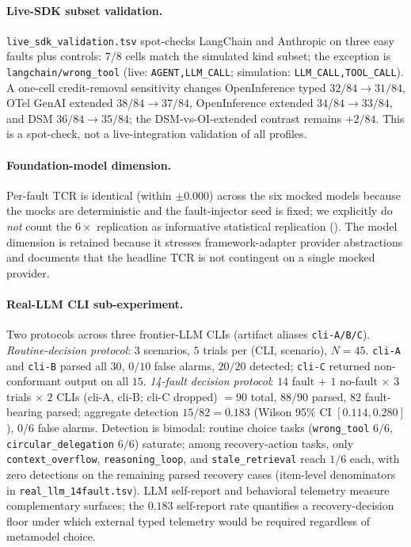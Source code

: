 \documentclass[a4paper,UKenglish,cleveref,autoref,thm-restate]{lipics-v2021}
\begin{document}
\paragraph*{Live-SDK subset validation.}
\texttt{live\_sdk\_validation.tsv} spot-checks LangChain and Anthropic
on three easy faults plus controls: 7/8 cells match the simulated
kind subset; the exception is \texttt{langchain/wrong\_tool}
(live: \texttt{AGENT,LLM\_CALL}; simulation:
\texttt{LLM\_CALL,TOOL\_CALL}). A one-cell credit-removal sensitivity
changes OpenInference typed $32/84 \to 31/84$, OTel GenAI extended
$38/84 \to 37/84$, OpenInference extended $34/84 \to 33/84$, and DSM
$36/84 \to 35/84$; the DSM-vs-OI-extended contrast remains $+2/84$.
This is a spot-check, not a live-integration validation of all profiles.

\paragraph*{Foundation-model dimension.}
Per-fault TCR is identical (within $\pm 0.000$) across the six
mocked models because the mocks are deterministic and the
fault-injector seed is fixed; we explicitly do \emph{not} count the
$6\times$ replication as informative statistical replication
().  The model dimension is retained because it
stresses framework-adapter provider abstractions and documents that
the headline TCR is not contingent on a single mocked provider.

\paragraph*{Real-LLM CLI sub-experiment.}
\label{sec:rq3-real-llm}
Two protocols across three frontier-LLM CLIs (artifact aliases
\texttt{cli-A/B/C}). \emph{Routine-decision protocol}: 3 scenarios,
$5$ trials per (CLI, scenario), $N = 45$. \texttt{cli-A} and
\texttt{cli-B} parsed all $30$, $0/10$ false alarms, $20/20$
detected; \texttt{cli-C} returned non-conformant output on all $15$.
\emph{14-fault decision protocol}: $14$ fault + $1$ no-fault
$\times$ $3$ trials $\times$ $2$ CLIs (cli-A, cli-B; cli-C dropped)
$= 90$ total, $88/90$ parsed, $82$ fault-bearing parsed; aggregate
detection $15/82 = 0.183$ (Wilson 95\% CI $[0.114, 0.280]$),
$0/6$ false alarms. Detection is bimodal: routine choice tasks
(\texttt{wrong\_tool} $6/6$, \texttt{circular\_delegation} $6/6$)
saturate; among recovery-action tasks, only
\texttt{context\_overflow}, \texttt{reasoning\_loop}, and
\texttt{stale\_retrieval} reach $1/6$ each, with zero detections on
the remaining parsed recovery cases (item-level denominators in
\texttt{real\_llm\_14fault.tsv}). LLM self-report and
behavioral telemetry measure complementary surfaces; the $0.183$
self-report rate quantifies a recovery-decision floor under which
external typed telemetry would be required regardless of metamodel
choice.
\end{document}
